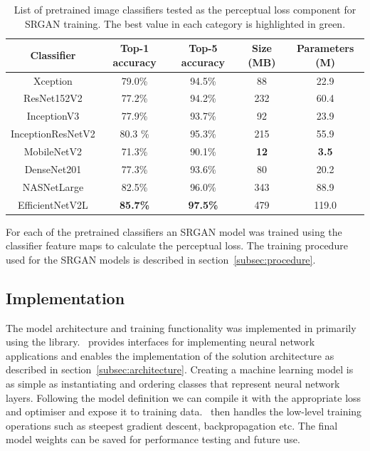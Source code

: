 \begin{table}
    \centering
    \begin{tabular}{ccccc}
        \toprule
        \textbf{Classifier} & \textbf{Top-1 accuracy} & \textbf{Top-5 accuracy} & \textbf{Size (MB)} & \textbf{Parameters (M)} \\
        \midrule
        Xception & 79.0\% & 94.5\% & 88 & 22.9 \\
        ResNet152V2 & 77.2\% & 94.2\% & 232 & 60.4 \\
        InceptionV3 & 77.9\% & 93.7\% & 92 & 23.9 \\
        InceptionResNetV2 & 80.3 \% & 95.3\% & 215 & 55.9 \\
        MobileNetV2 & 71.3\% & 90.1\% & \textbf{12} & \textbf{3.5} \\
        DenseNet201 & 77.3\% & 93.6\% & 80 & 20.2 \\
        NASNetLarge & 82.5\% & 96.0\% & 343 & 88.9 \\
    EfficientNetV2L & \textbf{85.7\%} & \textbf{97.5\%} & 479 & 119.0 \\
        \bottomrule
    \end{tabular}
    \caption{List of pretrained image classifiers tested as the perceptual loss component for SRGAN training. The best value in each category is highlighted in green.}
    \label{table:pretrained_classifiers}
\end{table}

For each of the pretrained classifiers an SRGAN model was trained using the classifier feature maps to calculate the perceptual loss. The training procedure used for the SRGAN models is described in section~\ref{subsec:procedure}.

\subsection{Implementation}
The model architecture and training functionality was implemented in  primarily using the  library.\  provides interfaces for implementing neural network applications and enables the implementation of the solution architecture as described in section~\ref{subsec:architecture}. Creating a machine learning model is as simple as instantiating and ordering  classes that represent neural network layers. Following the model definition we can compile it with the appropriate loss and optimiser and expose it to training data.\  then handles the low-level training operations such as steepest gradient descent, backpropagation etc. The final model weights can be saved for performance testing and future use.

